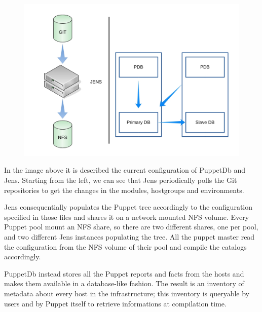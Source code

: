 \begin{figure}[H]
\includegraphics[width=\textwidth,height=\textheight,keepaspectratio]{ConfigurationManagement/Infrastructure_jens_pdb.jpg}
\end{figure}

In the image above it is described the current configuration of PuppetDb
and Jens. Starting from the left, we can see that Jens periodically polls
the Git repositories to get the changes in the modules, hostgroups and
environments.

Jens consequentially populates the Puppet tree accordingly to the
configuration specified in those files and shares it on a network mounted
NFS volume. Every Puppet pool mount an NFS share, so there are two
different shares, one per pool, and two different Jens instances
populating the tree. All the puppet master read the configuration from the
NFS volume of their pool and compile the catalogs accordingly.

PuppetDb instead stores all the Puppet reports and facts from the hosts
and makes them available in a database-like fashion. The result is an
inventory of metadata about every host in the infrastructure; this
inventory is queryable by users and by Puppet itself to retrieve
informations at compilation time.
